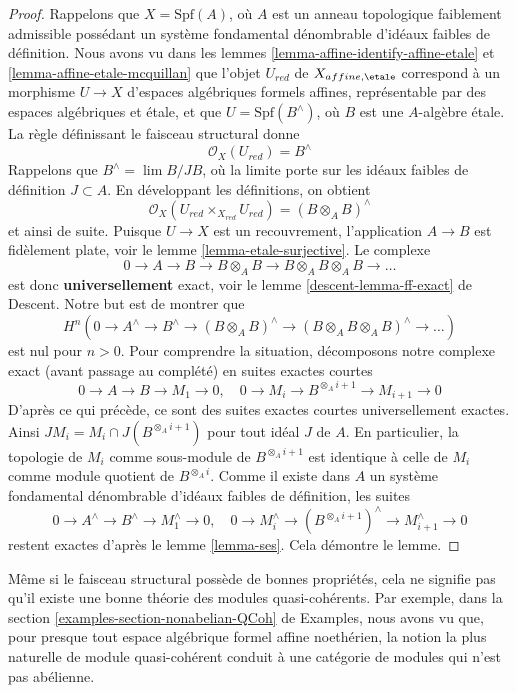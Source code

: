 \begin{proof}
\medskip\noindent
Rappelons que $X = \text{Spf}(A)$, où $A$ est un
anneau topologique faiblement admissible possédant un système
fondamental dénombrable d'idéaux faibles de définition.
Nous avons vu dans les lemmes
\ref{lemma-affine-identify-affine-etale} et
\ref{lemma-affine-etale-mcquillan}
que l'objet $U_{red}$ de $X_{affine, \etale}$
correspond à un morphisme $U \to X$ d'espaces algébriques formels
affines, représentable par des espaces algébriques et \'etale,
et que $U = \text{Spf}(B^\wedge)$, où $B$ est une $A$-algèbre \'etale.
La règle définissant le faisceau structural donne
$$
\mathcal{O}_X(U_{red}) = B^\wedge
$$
Rappelons que $B^\wedge = \lim B/JB$, où la limite porte sur les
idéaux faibles de définition $J \subset A$.
En développant les définitions, on obtient
$$
\mathcal{O}_X(U_{red} \times_{X_{red}} U_{red}) = (B \otimes_A B)^\wedge
$$
et ainsi de suite. Puisque $U \to X$ est un recouvrement, l'application $A \to B$
est fidèlement plate, voir le lemme \ref{lemma-etale-surjective}.
Le complexe
$$
0 \to A \to B \to B \otimes_A B \to B \otimes_A B \otimes_A B \to \ldots
$$
est donc {\bf universellement} exact, voir le lemme \ref{descent-lemma-ff-exact} de Descent.
Notre but est de montrer que
$$
H^n(0 \to A^\wedge \to B^\wedge \to (B \otimes_A B)^\wedge
\to (B \otimes_A B \otimes_A B)^\wedge \to \ldots)
$$
est nul pour $n > 0$. Pour comprendre la situation, décomposons notre
complexe exact (avant passage au complété) en suites exactes courtes
$$
0 \to A \to B \to M_1 \to 0,\quad
0 \to M_i \to B^{\otimes_A i + 1} \to M_{i + 1} \to 0
$$
D'après ce qui précède, ce sont des suites exactes courtes universellement
exactes. Ainsi $JM_i = M_i \cap J(B^{\otimes_A i + 1})$ pour
tout idéal $J$ de $A$. En particulier, la
topologie de $M_i$ comme sous-module de $B^{\otimes_A i + 1}$
est identique à celle de $M_i$ comme module quotient de
$B^{\otimes_A i}$. Comme il existe dans $A$ un système fondamental dénombrable
d'idéaux faibles de définition, les suites
$$
0 \to A^\wedge \to B^\wedge \to M_1^\wedge \to 0,\quad
0 \to M_i^\wedge \to (B^{\otimes_A i + 1})^\wedge \to M_{i + 1}^\wedge \to 0
$$
restent exactes d'après le lemme \ref{lemma-ses}. Cela démontre le lemme.
\end{proof}

\begin{remark}
\label{remark-bad-quasi-coherent}
Même si le faisceau structural possède de bonnes propriétés, cela ne
signifie pas qu'il existe une bonne théorie des modules quasi-cohérents. Par exemple,
dans la section \ref{examples-section-nonabelian-QCoh} de Examples,
nous avons vu que, pour presque tout espace algébrique formel affine noethérien,
la notion la plus naturelle de module quasi-cohérent conduit à une
catégorie de modules qui n'est pas abélienne.
\end{remark}





